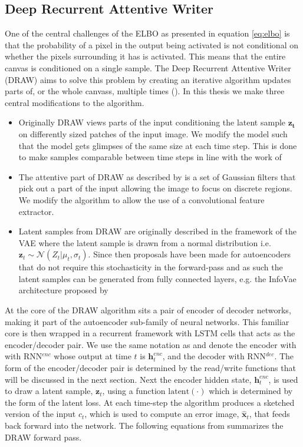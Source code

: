 \subsection{Deep Recurrent Attentive Writer}\label{sec:draw}

One of the central challenges of the ELBO as presented in equation \ref{eq:elbo} is that the probability of a pixel in the output being activated is not conditional on whether the pixels surrounding it has is activated. This means that the entire canvas is conditioned on a single sample. The Deep Recurrent Attentive Writer (DRAW) aims to solve this problem by creating an iterative algorithm updates parts of, or the whole canvass, multiple times (\cite{Gregor2015}). In this thesis we make three central modifications to the algorithm. 

\begin{itemize}
\item Originally DRAW views parts of the input conditioning the latent sample $\mathbf{z_t}$ on differently sized patches of the input image. We modify the model such that the model gets glimpses of the same size at each time step. This is done to make samples comparable between time steps in line with the work of \citet{Harris2019}
\item The attentive part of DRAW as described by \citet{Gregor2015} is a set of Gaussian filters that pick out a part of the input allowing the image to focus on discrete regions. We modify the algorithm to allow the use of a convolutional feature extractor.
\item Latent samples from DRAW are originally described in the framework of the VAE where the latent sample is drawn from a normal distribution i.e. $\mathbf{z}_t \sim \mathcal{N}(Z_t|\mu_t, \sigma_t)$. Since then proposals have been made for autoencoders that do not require this stochasticity in the forward-pass and as such the latent samples can be generated from fully connected layers, e.g. the InfoVae architecture proposed by \citet{Zhao}
\end{itemize}

\noindent At the core of the DRAW algorithm sits a pair of encoder of decoder networks, making it part of the autoencoder sub-family of neural networks. This familiar core is then wrapped in a recurrent framework with LSTM cells that acts as the encoder/decoder pair. We use the same notation as \citet{Gregor2015} and denote the encoder with with RNN${}^{enc}$ whose output at time $t$ is $\mathbf{h}_t^{enc}$, and the decoder with RNN${}^{dec}$. The form of the encoder/decoder pair is determined by the read/write functions that will be discussed in the next section. Next the encoder hidden state, $\mathbf{h}_t^{enc}$, is used to draw a latent sample, $\mathbf{z}_t$, using a function $\text{latent}(\cdot)$ which is determined by the form of the latent loss. At each time-step the algorithm produces a sketched version of the input $c_t$, which is used to compute an error image, $\hat{\mathbf{x}}_t$, that feeds back forward into the network. The following equations from \citet{Gregor2015} summarizes the DRAW forward pass.

